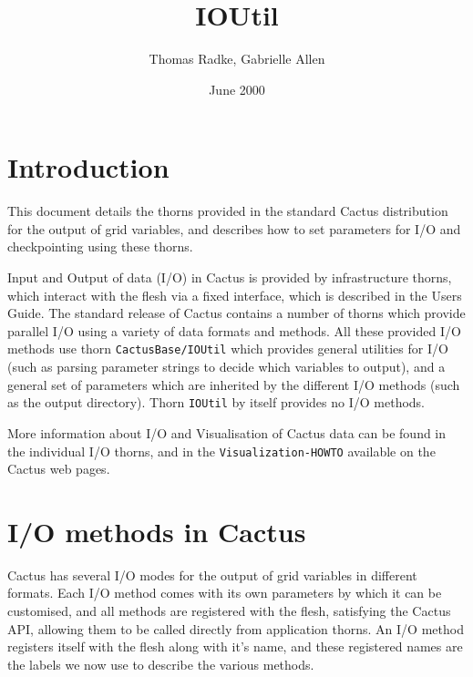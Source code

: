 \documentclass{article}
\begin{document}
\title{IOUtil}
\author{Thomas Radke, Gabrielle Allen}
\date{June 2000}
\maketitle

\section{Introduction}

This document details the thorns provided in the standard Cactus 
distribution for the output of grid variables, and describes how to 
set parameters for I/O and checkpointing using these thorns.

Input and Output of data (I/O) in Cactus is provided by infrastructure thorns,
which interact with the flesh via a fixed interface, which is described in 
the Users Guide. 
The standard release of Cactus contains a number of thorns 
which provide parallel I/O using a variety of data formats and methods. 
All these provided I/O methods use thorn {\tt CactusBase/IOUtil} which 
provides general utilities for I/O (such as parsing parameter strings to
decide which variables to output), and a general set of parameters which
are inherited by the different I/O methods (such as the output directory). 
Thorn {\tt IOUtil} by itself provides no I/O methods.

More information about I/O and Visualisation of Cactus data can be found in 
the individual I/O thorns, and in the {\tt Visualization-HOWTO} available 
on the Cactus web pages.

\section{I/O methods in Cactus}

Cactus has several I/O modes for the output of grid variables in different 
formats.
Each I/O method comes with its own parameters by which it can be customised,
and all methods are registered with the flesh, satisfying the 
Cactus API, allowing them to be called directly from application thorns. 
An I/O method registers itself with the flesh along with it's name, and 
these registered names are the labels we now use to describe the various
methods. 
\end{document}
